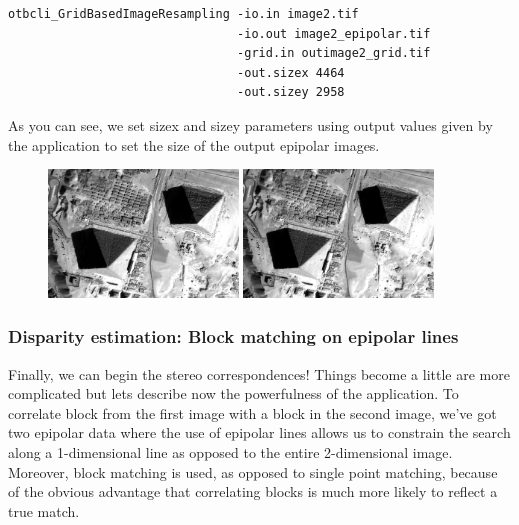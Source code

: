 \begin{verbatim}
otbcli_GridBasedImageResampling -io.in image2.tif
                                -io.out image2_epipolar.tif
                                -grid.in outimage2_grid.tif
                                -out.sizex 4464
                                -out.sizey 2958
\end{verbatim}

As you can see, we set sizex and sizey parameters using output values given by
the  application to set the size
of the output epipolar images.

\begin{figure}[!h]
  \center
  \includegraphics[width=0.45\textwidth]{../Art/MonteverdiImages/stereo_image1_epipolar.png}
  \includegraphics[width=0.45\textwidth]{../Art/MonteverdiImages/stereo_image2_epipolar.png}
  \label{fig:MeanShiftVectorImageFilter}
\end{figure}

\subsubsection{Disparity estimation: Block matching on epipolar lines}

Finally, we can begin the stereo correspondences! Things become a little are
more complicated but lets describe now the powerfulness of the
 application.  To correlate block from the first
image with a block in the second image, we've got two epipolar data where the
use of epipolar lines allows us to constrain the search along a 1-dimensional
line as opposed to the entire 2-dimensional image. Moreover, block matching is
used, as opposed to single point matching, because of the obvious advantage that
correlating blocks is much more likely to reflect a true match.


